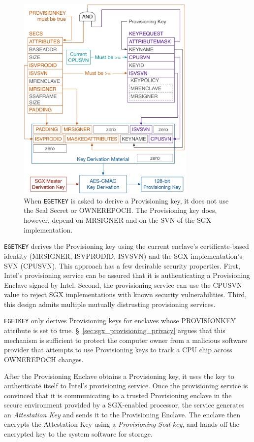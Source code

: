 \begin{figure}[hbt]
  \centering
  \includegraphics[width=87mm]{figures/sgx_egetkey_provision.pdf}
  \caption{
    When \texttt{EGETKEY} is asked to derive a Provisioning key, it does not
    use the Seal Secret or OWNEREPOCH. The Provisioning key does, however,
    depend on MRSIGNER and on the SVN of the SGX implementation.
  }
  \label{fig:sgx_egetkey_provision}
\end{figure}

\texttt{EGETKEY} derives the Provisioning key using the current enclave's
certificate-based identity (MRSIGNER, ISVPRODID, ISVSVN) and the SGX
implementation's SVN (CPUSVN). This approach has a few desirable security
properties. First, Intel's provisioning service can be assured that it is
authenticating a Provisioning Enclave signed by Intel. Second, the provisioning
service can use the CPUSVN value to reject SGX implementations with known
security vulnerabilities. Third, this design admits multiple mutually
distrusting provisioning services.

\texttt{EGETKEY} only derives Provisioning keys for enclaves whose PROVISIONKEY
attribute is set to true. \S~\ref{sec:sgx_provisioning_privacy} argues
that this mechanism is sufficient to protect the computer owner from a
malicious software provider that attempts to use Provisioning keys to track a
CPU chip across OWNEREPOCH changes.

After the Provisioning Enclave obtains a Provisioning key, it uses the key to
authenticate itself to Intel's provisioning service. Once the provisioning
service is convinced that it is communicating to a trusted Provisioning enclave
in the secure environment provided by a SGX-enabled processor, the service
generates an \textit{Attestation Key} and sends it to the Provisioning Enclave.
The enclave then encrypts the Attestation Key using a
\textit{Provisioning Seal key}, and hands off the encrypted key to the system
software for storage.

